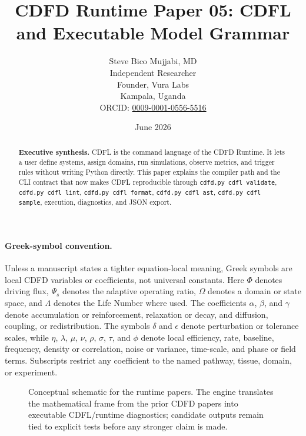 \documentclass[12pt,a4paper]{article}
\title{\textbf{CDFD Runtime Paper 05: CDFL and Executable Model Grammar}}
\author{Steve Bico Mujjabi, MD\\
\small Independent Researcher\\
\small Founder, Vura Labs\\
\small Kampala, Uganda\\
\small ORCID: \href{https://orcid.org/0009-0001-0556-5516}{0009-0001-0556-5516}}
\date{June 2026}
\begin{document}
\maketitle

\begin{abstract}
\noindent \textbf{Executive synthesis.} CDFL is the command language of the CDFD
Runtime. It lets a user define systems, assign domains, run simulations, observe
metrics, and trigger rules without writing Python directly. This paper explains
the compiler path and the CLI contract that now makes CDFL reproducible through
\texttt{cdfd.py cdfl validate}, \texttt{cdfd.py cdfl lint},
\texttt{cdfd.py cdfl format}, \texttt{cdfd.py cdfl ast},
\texttt{cdfd.py cdfl sample}, execution, diagnostics, and JSON export.
\end{abstract}

\paragraph{Greek-symbol convention.}
Unless a manuscript states a tighter equation-local meaning, Greek symbols are local CDFD variables or coefficients, not universal constants. Here $\Phi$ denotes driving flux, $\Psi_s$ denotes the adaptive operating ratio, $\Omega$ denotes a domain or state space, and $\Lambda$ denotes the Life Number where used. The coefficients $\alpha$, $\beta$, and $\gamma$ denote accumulation or reinforcement, relaxation or decay, and diffusion, coupling, or redistribution. The symbols $\delta$ and $\epsilon$ denote perturbation or tolerance scales, while $\eta$, $\lambda$, $\mu$, $\nu$, $\rho$, $\sigma$, $\tau$, and $\phi$ denote local efficiency, rate, baseline, frequency, density or correlation, noise or variance, time-scale, and phase or field terms. Subscripts restrict any coefficient to the named pathway, tissue, domain, or experiment.


\begin{figure}[ht]
\centering
{}
\caption{Conceptual schematic for the runtime papers. The engine translates the mathematical frame from the prior CDFD papers into executable CDFL/runtime diagnostics; candidate outputs remain tied to explicit tests before any stronger claim is made.}
\end{figure}
\end{document}
